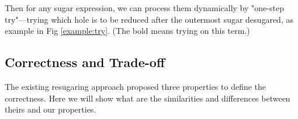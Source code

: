 Then for any sugar expression, we can process them dynamically by "one-step try"---trying which hole is to be reduced after the outermost sugar desugared, as example in Fig \ref{example:try}. (The bold  means trying on this term.)



\subsection{Correctness and Trade-off}
The existing resugaring approach proposed three properties to define the correctness. Here we will show what are the similarities and differences between theirs and our properties.

